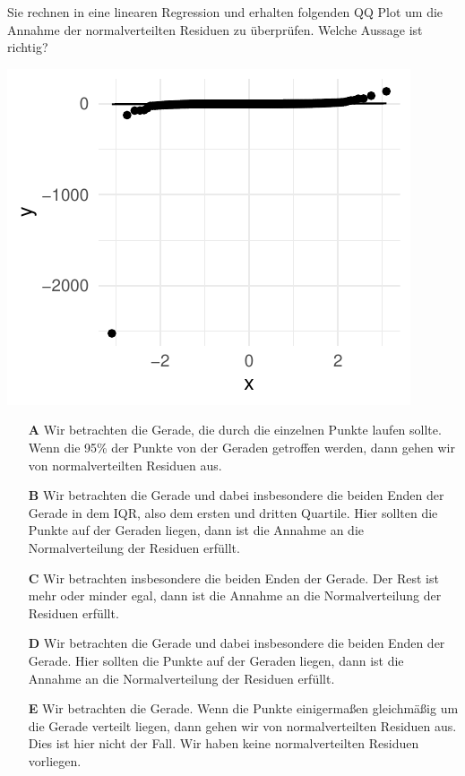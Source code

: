 \documentclass[a4paper, 9pt]{scrartcl}\usepackage[]{graphicx}\usepackage[]{xcolor}
\makeatletter
\def\maxwidth{ %
  \ifdim\Gin@nat@width>\linewidth
    \linewidth
  \else
    \Gin@nat@width
  \fi
}
\makeatother
\begin{document}
Sie rechnen in eine linearen Regression und erhalten folgenden QQ Plot um die Annahme der normalverteilten Residuen zu überprüfen. Welche Aussage ist richtig?



{\centering \includegraphics[width=\maxwidth]{img/mc-regression-05-a-1} 

}







\begin{enumerate}
\item [\textbf{A} \msquare] Wir betrachten die Gerade, die durch die einzelnen Punkte laufen sollte. Wenn die 95\% der Punkte von der Geraden getroffen werden, dann gehen wir von normalverteilten Residuen aus.
\item [\textbf{B} \msquare] Wir betrachten die Gerade und dabei insbesondere die beiden Enden der Gerade in dem IQR, also dem ersten und dritten Quartile. Hier sollten die Punkte auf der Geraden liegen, dann ist die Annahme an die Normalverteilung der Residuen erfüllt.
\item [\textbf{C} \msquare] Wir betrachten insbesondere die beiden Enden der Gerade. Der Rest ist mehr oder minder egal, dann ist die Annahme an die Normalverteilung der Residuen erfüllt.
\item [\textbf{D} \msquare] Wir betrachten die Gerade und dabei insbesondere die beiden Enden der Gerade. Hier sollten die Punkte auf der Geraden liegen, dann ist die Annahme an die Normalverteilung der Residuen erfüllt.
\item [\textbf{E} \msquare] Wir betrachten die Gerade. Wenn die Punkte einigermaßen gleichmäßig um die Gerade verteilt liegen, dann gehen wir von normalverteilten Residuen aus. Dies ist hier nicht der Fall. Wir haben keine normalverteilten Residuen vorliegen.
\end{enumerate}
\end{document}
